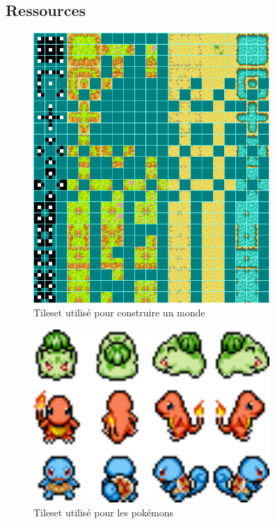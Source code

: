 \documentclass[a4paper,12pt]{article}
\begin{document}
    \subsection{Ressources}
    \begin{figure}[ht]
    \begin{center}
        \includegraphics[width=0.8\textwidth]{tilemap.png}
    \end{center}
    \caption{Tileset utilisé pour construire un monde}
    \end{figure}

    \begin{figure}[ht]
    \begin{center}
        \includegraphics[width=0.8\textwidth]{pokemonLatex.png}
    \end{center}
    \caption{Tileset utilisé pour les pokémons}
    \end{figure}
\end{document}
